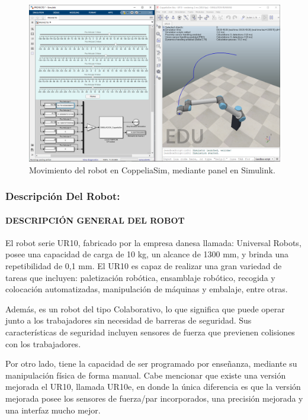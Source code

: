 \documentclass{article}
\begin{document}
\begin{sloppypar}
\begin{figure}[H]
    \centering
    \includegraphics[width=1\textwidth] {Movimiento del robot en CoppeliaSim, mediante panel en Simulink}
    \caption{Movimiento del robot en CoppeliaSim, mediante panel en Simulink.}
    \label{fig:Movimiento del robot en CoppeliaSim, mediante panel en Simulink}
\end{figure}


\subsubsection{Descripción Del Robot:}
\label{sec:Descripción Del Robot:}

\paragraph{DESCRIPCIÓN GENERAL DEL ROBOT}
\label{sec:DESCRIPCIÓN GENERAL DEL ROBOT}
\hfill

El robot serie UR10, fabricado por la empresa danesa llamada: Universal Robots, posee una capacidad de carga de 10 kg, un alcance de 1300 mm, y brinda una repetibilidad de 0,1 mm. El UR10 es capaz de realizar una gran variedad de tareas que incluyen: paletización robótica, ensamblaje robótico, recogida y colocación automatizadas, manipulación de máquinas y embalaje, entre otras.

Además, es un robot del tipo Colaborativo, lo que significa que puede operar junto a los trabajadores sin necesidad de barreras de seguridad. Sus características de seguridad incluyen sensores de fuerza que previenen colisiones con los trabajadores.

Por otro lado, tiene la capacidad de ser programado por enseñanza, mediante su manipulación física de forma manual. Cabe mencionar que existe una versión mejorada el UR10, llamada UR10e, en donde la única diferencia es que la versión mejorada posee los sensores de fuerza/par incorporados, una precisión mejorada y una interfaz mucho mejor.


\end{sloppypar}
\end{document}
